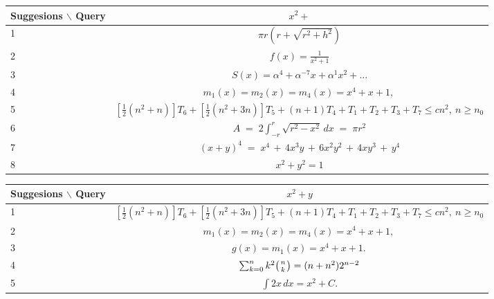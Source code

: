 \documentclass[a4paper]{article}
\begin{document}
\begin{center}
\begin{tabular}{lc}
Suggesions $\backslash$ Query  & $x^2 + $ \\
\hline
 1 &  $\pi r\left(r+\sqrt{r^{2}+h^{2}}\right)$ \\
 2 &  $ f(x)=\frac{1}{x^{2}+1} $\\
 3 & $ S(x)=\alpha^{4}+\alpha^{-7}x+\alpha^{1}x^{2}+ ...$ \\
 4 & $ m_{1}(x)=m_{2}(x)=m_{4}(x)=x^{4}+x+1,\, $  \\
 5 & $ \left[\frac{1}{2}(n^{2}+n)\right]T_{6}+\left[\frac{1}{2}(n^{2}+3n)\right]
T_{5} +(n+1)T_{4}+T_{1}+T_{2}+T_{3}+T_{7}\leq cn^{2},\ n\geq n_{0} $ \\
 6 & $   A\;=\;2\int_{-r}^{r}\sqrt{r^{2}-x^{2}}\,dx\;=\;\pi r^{2}     $ \\
 7 & $ (x+y)^{4}\;=\;x^{4}\,+\,4x^{3}y\,+\,6x^{2}y^{2}\,+\,4xy^{3}\,+\,y^{4} $ \\
 8 & $ x^{2}+y^{2}=1 $ \\
\end{tabular}
\end{center}

\begin{center}
\begin{tabular}{lc}
Suggesions $\backslash$ Query  & $x^2 + y$ \\
\hline
 1 & $ \left[\frac{1}{2}(n^{2}+n)\right]T_{6}+\left[\frac{1}{2}(n^{2}+3n)\right]
T_{5} +(n+1)T_{4}+T_{1}+T_{2}+T_{3}+T_{7}\leq cn^{2},\ n\geq n_{0} $ \\
 2 &  $ m_{1}(x)=m_{2}(x)=m_{4}(x)=x^{4}+x+1,\, $\\
 3 & $ g(x)=m_{1}(x)=x^{4}+x+1.\, $ \\
 4 & $ \sum_{k=0}^{n}k^{2}{\textstyle\left({{n}\atop{k}}\right)}=(n+n^{2})2^{n-2}  $  \\
 5 & $ \int 2x\,dx=x^{2}+C. $ \\
\end{tabular}
\end{center}



\end{document}
